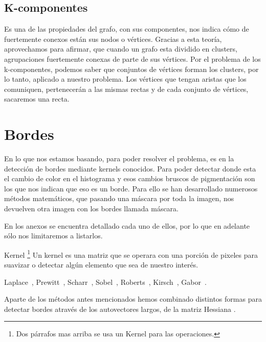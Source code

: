 \subsection{K-componentes}
Es una de las propiedades del grafo, con sus componentes, nos indica cómo de fuertemente conexos están sus nodos o vértices.
Gracias a esta teoría, aprovechamos para afirmar, que cuando un grafo esta dividido en clusters, agrupaciones fuertemente conexas de parte de sus vértices.
Por el problema de los k-componentes, podemos saber que conjuntos de vértices forman los clusters, por lo tanto, aplicado a nuestro problema.
Los vértices que tengan aristas que los comuniquen, pertenecerán a las mismas rectas y de cada conjunto de vértices, sacaremos una recta.

\section{Bordes}
En lo que nos estamos basando, para poder resolver el problema,
es en la detección de bordes mediante kernels conocidos.
Para poder detectar donde esta el cambio de color en el histograma y esos cambios bruscos de pigmentación son los que nos indican que eso es un borde.
Para ello se han desarrollado numerosos métodos matemáticos, que pasando una máscara por toda la imagen, nos devuelven otra imagen con los bordes llamada máscara.

En los anexos se encuentra detallado cada uno de ellos, por lo que en adelante sólo nos limitaremos a listarlos.

Kernel \cite{wiki:kernels} \footnote{Dos párrafos mas arriba se usa un Kernel para las operaciones.} Un kernel es una matriz que se operara con una porción de pixeles para suavizar o detectar algún elemento que sea de nuestro interés.

Laplace~\cite{wiki:Laplace}, Prewitt~\cite{wiki:Prewitt}, Scharr~\cite{jon:Scharr}, Sobel~\cite{wiki:Sobel}, Roberts~\cite{wiki:Roberts}, Kirsch~\cite{wiki:Kirsch}, Gabor~\cite{wiki:Gabor}.
 
Aparte de los métodos antes mencionados hemos combinado distintos formas para detectar bordes através de los autovectores \cite{wiki:Eigenvector} largos, de la matriz Hessiana \cite{wiki:Hessiana}.